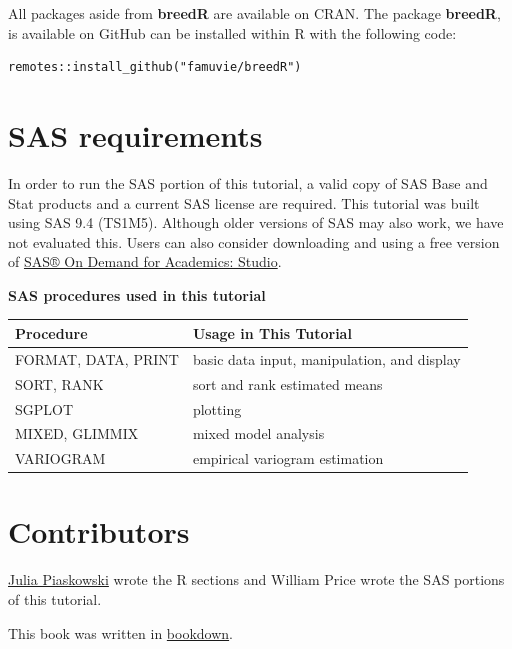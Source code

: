 \documentclass[
]{book}
\begin{document}
All packages aside from \textbf{breedR} are available on CRAN. The package \textbf{breedR}, is available on GitHub can be installed within R with the following code:

\begin{verbatim}
remotes::install_github("famuvie/breedR")
\end{verbatim}

\hypertarget{sas-requirements}{%
\section{SAS requirements}\label{sas-requirements}}

In order to run the SAS portion of this tutorial, a valid copy of SAS Base and Stat products and a current SAS license are required. This tutorial was built using SAS 9.4 (TS1M5). Although older versions of SAS may also work, we have not evaluated this. Users can also consider downloading and using a free version of \href{https://www.sas.com/en_us/software/on-demand-for-academics/references/getting-started-with-sas-ondemand-for-academics-studio.html}{SAS® On Demand for Academics: Studio}.

\textbf{SAS procedures used in this tutorial}

\begin{longtable}[]{@{}ll@{}}
\toprule\noalign{}
Procedure & Usage in This Tutorial \\
\midrule\noalign{}
\endhead
\bottomrule\noalign{}
\endlastfoot
FORMAT, DATA, PRINT & basic data input, manipulation, and display \\
SORT, RANK & sort and rank estimated means \\
SGPLOT & plotting \\
MIXED, GLIMMIX & mixed model analysis \\
VARIOGRAM & empirical variogram estimation \\
\end{longtable}

\hypertarget{contributors}{%
\section{Contributors}\label{contributors}}

\href{mailto:jpiaskowski@uidaho.edu}{Julia Piaskowski} wrote the R sections and William Price wrote the SAS portions of this tutorial.

This book was written in \href{https://bookdown.org/yihui/bookdown}{bookdown}.
\end{document}
